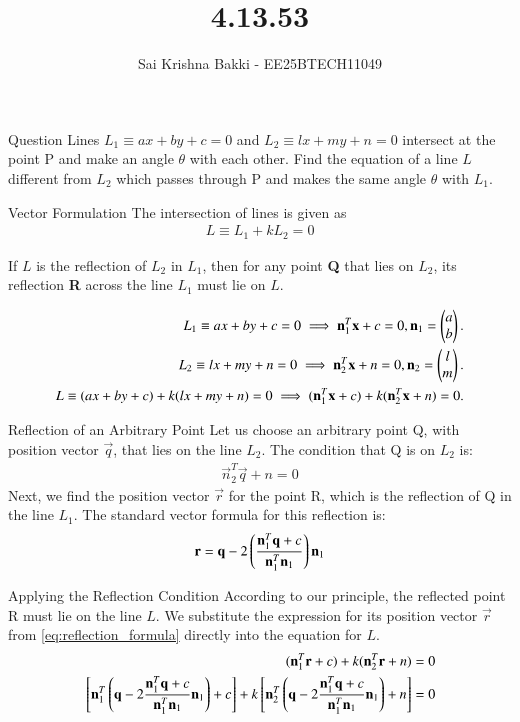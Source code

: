 \documentclass{beamer}
\title %
{4.13.53}
\date{}
\author %
{Sai Krishna Bakki - EE25BTECH11049}
\begin{document}
\frame{\titlepage}
\begin{frame}{Question}
Lines $L_1 \equiv ax + by + c = 0$ and $L_2 \equiv lx + my + n = 0$ intersect at the point P and make an angle $\theta$ with each other. Find the equation of a line $L$ different from $L_2$ which passes through P and makes the same angle $\theta$ with $L_1$.
\end{frame}

\begin{frame}{Vector Formulation}
    The intersection of lines is given as
\begin{align}
L \equiv L_1 + k L_2 = 0
\end{align}

If $L$ is the reflection of $L_2$ in $L_1$, then for any point \textbf{Q} that lies on $L_2$, its reflection \textbf{R} across the line $L_1$ must lie on $L$.

\begin{align}
 L_1 \equiv ax + by + c = 0 \implies \mathbf{n}_1^T \mathbf{x} + c = 0, \mathbf{n}_1 = \begin{pmatrix} a \\ b\end{pmatrix}.\\
L_2 \equiv lx + my + n = 0 \implies \mathbf{n}_2^T \mathbf{x} + n = 0, \mathbf{n}_2 = \begin{pmatrix} l \\ m\end{pmatrix}. \\
L \equiv (ax+by+c) + k(lx+my+n) = 0 \implies (\mathbf{n}_1^T \mathbf{x} + c) + k(\mathbf{n}_2^T \mathbf{x} + n) = 0.
\end{align}
\end{frame}
\begin{frame}{Reflection of an Arbitrary Point}
    Let us choose an arbitrary point Q, with position vector $\vec{q}$, that lies on the line $L_2$. The condition that Q is on $L_2$ is:
\begin{align}
\vec{n}_2^T \vec{q} + n = 0
\label{eq:q_on_l2}
\end{align}
Next, we find the position vector $\vec{r}$ for the point R, which is the reflection of Q in the line $L_1$. The standard vector formula for this reflection is:
\begin{align}
\mathbf{r} = \mathbf{q} - 2 \left( \frac{\mathbf{n}_1^T \mathbf{q} + c}{\mathbf{n}_1^T \mathbf{n}_1} \right) \mathbf{n}_1
\label{eq:reflection_formula}
\end{align}
\end{frame}
\begin{frame}{Applying the Reflection Condition}
    According to our principle, the reflected point R must lie on the line $L$. We substitute the expression for its position vector $\vec{r}$ from \eqref{eq:reflection_formula} directly into the equation for $L$.
\begin{align}
(\mathbf{n}_1^T \mathbf{r} + c) + k(\mathbf{n}_2^T \mathbf{r} + n) = 0\\
     {}\left[ \mathbf{n}_1^T \left( \mathbf{q} - 2 \frac{\mathbf{n}_1^T \mathbf{q} + c}{\mathbf{n}_1^T \mathbf{n}_1} \mathbf{n}_1 \right) + c \right] + k {}\left[ \mathbf{n}_2^T \left( \mathbf{q} - 2 \frac{\mathbf{n}_1^T \mathbf{q} + c}{\mathbf{n}_1^T \mathbf{n}_1} \mathbf{n}_1 \right) + n \right] = 0 
     \end{align}
     \end{frame}
\end{document}

